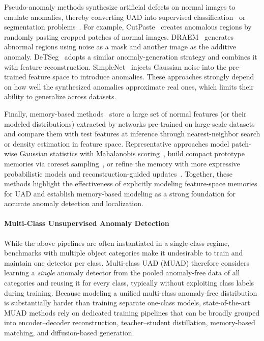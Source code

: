 \documentclass{article}
\theoremstyle{plain}
\theoremstyle{definition}
\theoremstyle{remark}
\begin{document}
Pseudo-anomaly methods synthesize artificial defects on normal images to emulate anomalies, thereby converting UAD into supervised classification~\cite{li2021cutpaste} or segmentation problems~\cite{zavrtanik2021draem}. For example, CutPaste~\cite{li2021cutpaste} creates anomalous regions by randomly pasting cropped patches of normal images. DRAEM~\cite{zavrtanik2021draem} generates abnormal regions using noise as a mask and another image as the additive anomaly. DeTSeg~\cite{zhang2023destseg} adopts a similar anomaly-generation strategy and combines it with feature reconstruction. SimpleNet~\cite{liu2023simplenet} injects Gaussian noise into the pre-trained feature space to introduce anomalies. These approaches strongly depend on how well the synthesized anomalies approximate real ones, which limits their ability to generalize across datasets.

Finally, memory-based methods~\cite{defard2021padim,roth2022towards,bae2023pni,hyun2024reconpatch} store a large set of normal features (or their modeled distributions) extracted by networks pre-trained on large-scale datasets and compare them with test features at inference through nearest-neighbor search or density estimation in feature space. Representative approaches model patch-wise Gaussian statistics with Mahalanobis scoring~\cite{defard2021padim}, build compact prototype memories via coreset sampling~\cite{roth2022towards}, or refine the memory with more expressive probabilistic models and reconstruction-guided updates~\cite{bae2023pni,hyun2024reconpatch}. Together, these methods highlight the effectiveness of explicitly modeling feature-space memories for UAD and establish memory-based modeling as a strong foundation for accurate anomaly detection and localization.


\paragraph{Multi-Class Unsupervised Anomaly Detection}
While the above pipelines are often instantiated in a single-class regime, benchmarks with multiple object categories make it undesirable to train and maintain one detector per class. Multi-class UAD (MUAD) therefore considers learning a \emph{single} anomaly detector from the pooled anomaly-free data of all categories and reusing it for every class, typically without exploiting class labels during training. Because modeling a unified multi-class anomaly-free distribution is substantially harder than training separate one-class models, state-of-the-art MUAD methods rely on dedicated training pipelines that can be broadly grouped into encoder--decoder reconstruction, teacher--student distillation, memory-based matching, and diffusion-based generation.
\end{document}
